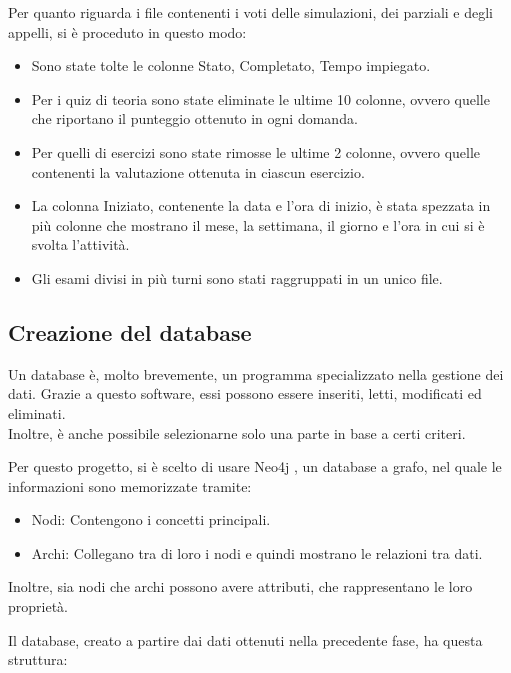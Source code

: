 Per quanto riguarda i file contenenti i voti delle simulazioni, dei parziali e degli appelli, si è proceduto in questo modo:
\begin{itemize}
\item Sono state tolte le colonne Stato, Completato, Tempo impiegato.
\item Per i quiz di teoria sono state eliminate le ultime 10 colonne, ovvero quelle che riportano il punteggio ottenuto in ogni domanda.
\item Per quelli di esercizi sono state rimosse le ultime 2 colonne, ovvero  quelle contenenti la valutazione ottenuta in ciascun esercizio.
\item La colonna Iniziato, contenente la data e l'ora di inizio, è stata spezzata in più colonne che mostrano il mese, la settimana, il giorno e l'ora in cui si è svolta l'attività.
\item Gli esami divisi in più turni sono stati raggruppati in un unico file.
\end{itemize}

\subsection{Creazione del database}

Un database è, molto brevemente, un programma specializzato nella gestione dei dati. Grazie a questo software, essi possono essere inseriti, letti, modificati ed eliminati. \\ Inoltre, è anche possibile selezionarne solo una parte in base a certi criteri.

Per questo progetto, si è scelto di usare Neo4j \cite{Neo4j}, un database a grafo, nel quale le informazioni sono memorizzate tramite:
\begin{itemize}
   \item Nodi: Contengono i concetti principali.
   \item Archi: Collegano tra di loro i nodi e quindi mostrano le relazioni tra dati.
\end{itemize}

Inoltre, sia nodi che archi possono avere attributi, che rappresentano le loro proprietà.

Il database, creato a partire dai dati ottenuti nella precedente fase, ha questa struttura:

